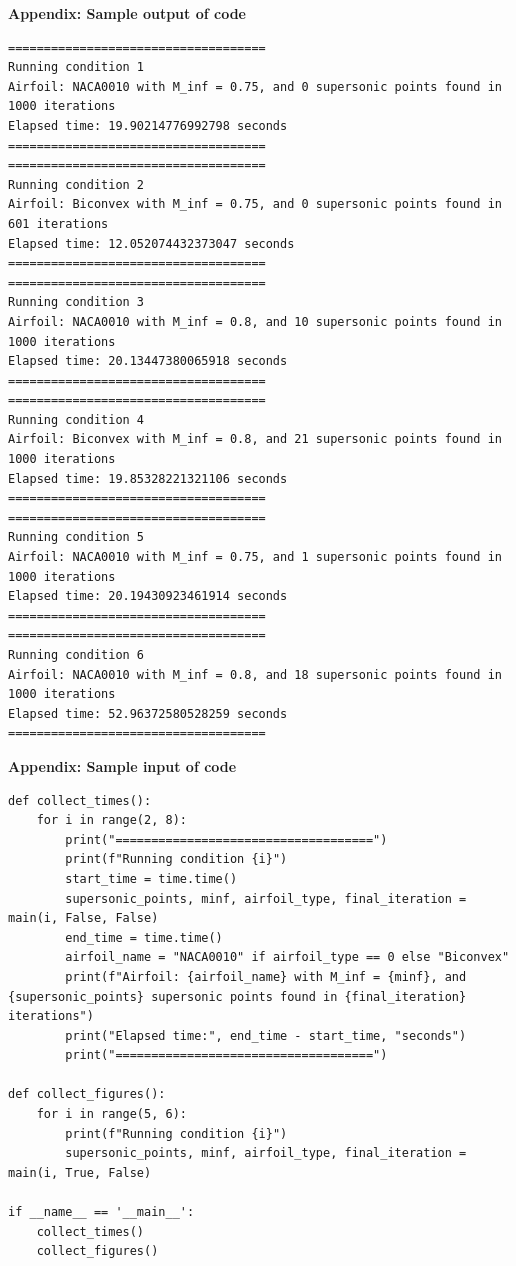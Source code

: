 \documentclass[12pt]{article}
\theoremstyle{definition}
\begin{document}
\large
\noindent \textbf{Appendix: Sample output of code}\\
\tiny
\begin{verbatim}
====================================
Running condition 1
Airfoil: NACA0010 with M_inf = 0.75, and 0 supersonic points found in 1000 iterations
Elapsed time: 19.90214776992798 seconds
====================================
====================================
Running condition 2
Airfoil: Biconvex with M_inf = 0.75, and 0 supersonic points found in 601 iterations
Elapsed time: 12.052074432373047 seconds
====================================
====================================
Running condition 3
Airfoil: NACA0010 with M_inf = 0.8, and 10 supersonic points found in 1000 iterations
Elapsed time: 20.13447380065918 seconds
====================================
====================================
Running condition 4
Airfoil: Biconvex with M_inf = 0.8, and 21 supersonic points found in 1000 iterations
Elapsed time: 19.85328221321106 seconds
====================================
====================================
Running condition 5
Airfoil: NACA0010 with M_inf = 0.75, and 1 supersonic points found in 1000 iterations
Elapsed time: 20.19430923461914 seconds
====================================
====================================
Running condition 6
Airfoil: NACA0010 with M_inf = 0.8, and 18 supersonic points found in 1000 iterations
Elapsed time: 52.96372580528259 seconds
====================================
\end{verbatim}

\large
\noindent \textbf{Appendix: Sample input of code}\\
\tiny
\begin{verbatim}
def collect_times():
    for i in range(2, 8):
        print("====================================")
        print(f"Running condition {i}")
        start_time = time.time()
        supersonic_points, minf, airfoil_type, final_iteration = main(i, False, False)
        end_time = time.time()
        airfoil_name = "NACA0010" if airfoil_type == 0 else "Biconvex"
        print(f"Airfoil: {airfoil_name} with M_inf = {minf}, and {supersonic_points} supersonic points found in {final_iteration} iterations")
        print("Elapsed time:", end_time - start_time, "seconds")
        print("====================================")

def collect_figures():
    for i in range(5, 6):
        print(f"Running condition {i}")
        supersonic_points, minf, airfoil_type, final_iteration = main(i, True, False)

if __name__ == '__main__':
    collect_times()
    collect_figures()    
\end{verbatim}
\end{document}
